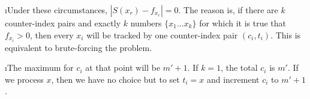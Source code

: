 \documentclass[fleqn]{article}
\begin{document}
\i Under these circumstances, $|S(x_r) - f_{x_r}| = 0$. The reason is, if there are $k$ counter-index pairs and exactly $k$ numbers $\{x_1 \ldots x_k\}$ for which it is true that $f_{x_i} > 0$, then every $x_i$ will be tracked by one counter-index pair $(c_i, t_i)$. This is equivalent to brute-forcing the problem.

\i The maximum for $c_i$ at that point will be $m' + 1$. If $k = 1$, the total $c_i$ is $m'$. If we process $x$, then we have no choice but to set $t_i = x$ and increment $c_i$ to $m' + 1$.

\ene
\end{document}
